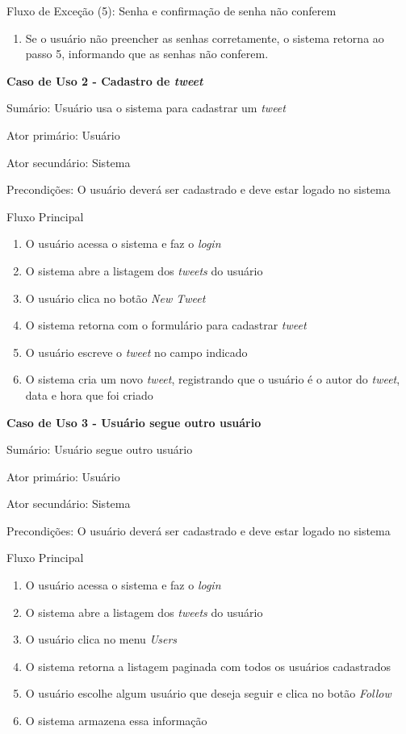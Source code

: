 Fluxo de Exceção (5): Senha e confirmação de senha não conferem
\begin{enumerate}
\item Se o usuário não preencher as senhas corretamente, o sistema retorna ao passo 5, informando que as senhas não conferem.
\end{enumerate}


\textbf{Caso de Uso 2 - Cadastro de \textit{tweet}}

Sumário: Usuário usa o sistema para cadastrar um \textit{tweet}

Ator primário: Usuário

Ator secundário: Sistema

Precondições: O usuário deverá ser cadastrado e deve estar logado no sistema

Fluxo Principal
\begin{enumerate}
\item O usuário acessa o sistema e faz o \textit{login}
\item O sistema abre a listagem dos \textit{tweets} do usuário
\item O usuário clica no botão \textit{New Tweet}
\item O sistema retorna com o formulário para cadastrar \textit{tweet}
\item O usuário escreve o \textit{tweet} no campo indicado
\item O sistema cria um novo \textit{tweet}, registrando que o usuário é o autor do \textit{tweet}, data e hora que foi criado
\end{enumerate}

\textbf{Caso de Uso 3 - Usuário segue outro usuário}

Sumário: Usuário segue outro usuário

Ator primário: Usuário

Ator secundário: Sistema

Precondições: O usuário deverá ser cadastrado e deve estar logado no sistema

Fluxo Principal
\begin{enumerate}
\item O usuário acessa o sistema e faz o \textit{login}
\item O sistema abre a listagem dos \textit{tweets} do usuário
\item O usuário clica no menu \textit{Users}
\item O sistema retorna a listagem paginada com todos os usuários cadastrados
\item O usuário escolhe algum usuário que deseja seguir e clica no botão \textit{Follow}
\item O sistema armazena essa informação
\end{enumerate}

